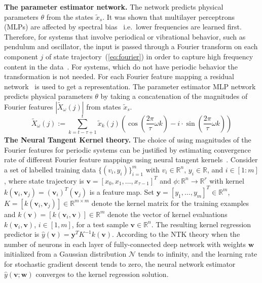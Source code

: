 \documentclass[acmtog]{techreportacmart}
\begin{document}
\textbf{The parameter estimator network.} 
The network predicts physical parameters ${\theta}$  from the states $\tilde{x}_{s}$. It was shown that multilayer perceptrons (MLPs) are affected by spectral bias~\cite{rahamanspectral} i.e.~lower frequencies are learned first. Therefore, for systems that involve periodical or vibrational behavior, such as pendulum and oscillator, the input is passed through a Fourier transform on each component ${j}$ of state trajectory~(\ref{eq:fourier}) in order to capture high frequency content in the data~\cite{tancik2020ffn}. For systems, which do not have periodic behavior the transformation is not needed. For each Fourier feature mapping a residual network~\cite{7780459} is used to get a representation. The parameter estimator MLP network predicts physical parameters ${\theta}$ by taking a concatenation of the magnitudes of Fourier features ${|\tilde{X}_{\omega}(j)|}$ from states $\tilde{x}_{s}$.
\begin{equation}
  \label{eq:fourier}
  \tilde{X}_{\omega}(j) := \sum_{k=t-\tau+1}^{t} \tilde{x}_k(j) \left( \cos \left(\frac{2\pi}{\tau} \omega k \right) - i \cdot \sin \left(\frac{2\pi}{\tau} \omega k \right) \right)
\end{equation}
\textbf{The Neural Tangent Kernel theory.} The choice of using magnitudes of the Fourier features for periodic systems can be justified by estimating convergence rate of different Fourier feature mappings using neural tangent kernels~\cite{NEURIPS2018_5a4be1fa}. Consider a set of labelled training data $\{(v_i, y_i)\}_{i=1}^{m}$ with $v_i \in \mathbb{R}^n$, $y_i \in \mathbb{R}$, and $i \in [1 : m]$, where state trajectory is ${\mathbf{v} = [x_0, x_1, \ldots, x_{\tau-1}]^T}$ and ${\phi: \mathbb{R}^n \rightarrow \mathbb{R}^r}$ with kernel ${k(\mathbf{v}_i, \mathbf{v}_j) = (\mathbf{v}_i)^T (\mathbf{v}_j)}$ is a feature map. Set $\mathbf{y} = [y_1, \ldots, y_m]^T \in \mathbb{R}^m$, $K = [k(\mathbf{v}_i, \mathbf{v}_j)] \in \mathbb{R}^{m \times m}$ denote the kernel matrix for the training examples and $k(\mathbf{v}) = [k(\mathbf{v}_i, \mathbf{v})] \in \mathbb{R}^{m}$ denote the vector of kernel evaluations $k(\mathbf{v}_i, \mathbf{v})$, $i \in [1, m]$, for a test sample $\mathbf{v} \in \mathbb{R}^n$. The resulting kernel regression predictor is $\hat{y}(\mathbf{v}) = \mathbf{y}^T K^{-1} k(\mathbf{v})$.
According to the NTK theory when the number of neurons in each layer of fully-connected deep network with weights ${\mathbf{w}}$ initialized from a Gaussian distribution ${\mathcal{N}}$ tends to infinity, and the learning rate for stochastic gradient descent tends to zero, the neural network estimator ${\hat{y}(\mathbf{v};\mathbf{w})}$ converges to the kernel regression solution. 
\end{document}
